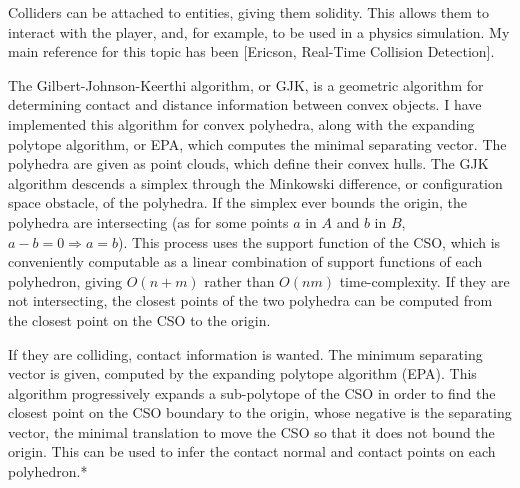 \documentclass{article}
\begin{document}

    Colliders can be attached to entities, giving them solidity. This allows them to interact with the player, and, for example, to be used in a physics simulation. My main reference
    for this topic has been [Ericson, Real-Time Collision Detection].
    
    The Gilbert-Johnson-Keerthi algorithm, or GJK, is a geometric algorithm for determining contact and distance information between convex objects. I have implemented
    this algorithm for convex polyhedra, along with the expanding polytope algorithm, or EPA, which computes the minimal separating vector.    
    The polyhedra are given as point clouds, which define their convex hulls.
    The GJK algorithm descends a simplex through the Minkowski difference, or configuration space obstacle, of the polyhedra.
    If the simplex ever bounds the origin, the polyhedra are intersecting (as for some
    points $a$ in $A$ and $b$ in $B$, $a - b = 0 \Rightarrow a = b$). This process uses the support function of the CSO, which is conveniently computable
    as a linear combination of support functions of each polyhedron, giving $O(n + m)$ rather than $O(nm)$ time-complexity.
    If they are not intersecting, the closest points of the two polyhedra can be computed from
    the closest point on the CSO to the origin.

    If they are colliding, contact information is wanted. The minimum separating vector is given,
    computed by the expanding polytope algorithm (EPA). This algorithm progressively expands
    a sub-polytope of the CSO in order to find the closest point on the CSO boundary to the origin,
    whose negative is the separating vector, the minimal translation to move the CSO so that it does not
    bound the origin. This can be used to infer the contact normal and contact points on each polyhedron.*
\end{document}
